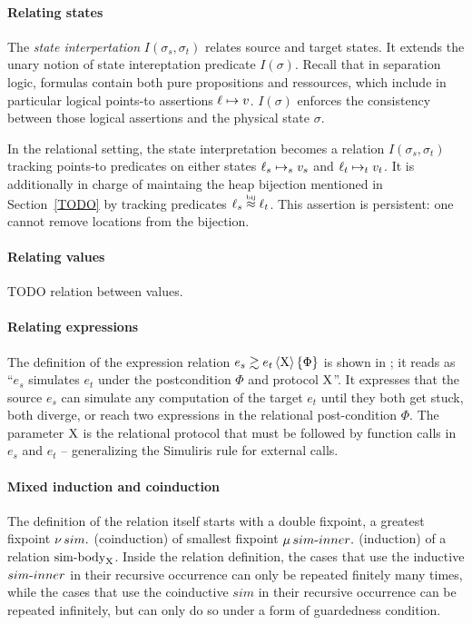 \paragraph{Relating states} The \emph{state interpertation} $I(\sigma_s, \sigma_t)$ relates source and target states. It extends the unary notion of state intereptation predicate $I(\sigma)$. Recall that in separation logic, formulas contain both pure propositions and ressources, which include in particular logical points-to assertions $\ell \mapsto v$. $I(\sigma)$ enforces the consistency between those logical assertions and the physical state $\sigma$.

In the relational setting, the state interpretation becomes a relation $I(\sigma_s, \sigma_t)$ tracking points-to predicates on either states $\ell_s \mapsto_s v_s$ and $\ell_t \mapsto_t v_t$. It is additionally in charge of maintaing the heap bijection mentioned in Section~\ref{TODO} by tracking predicates $\ell_s \stackrel{\scriptscriptstyle\textrm{bij}}{\approx} \ell_t$. This assertion is persistent: one cannot remove locations from the bijection.

\paragraph{Relating values} TODO relation between values.

\paragraph{Relating expressions} The definition of the expression relation $\iSim[\Chi]{\Phi}{e_s}{e_t}$ is shown in ; it reads as ``$e_s$ simulates $e_t$ under the postcondition $\Phi$ and protocol $\mathrm{X}$''. It expresses that the source $e_s$ can simulate any computation of the target $e_t$ until they both get stuck, both diverge, or reach two expressions in the relational post-condition $\Phi$. The parameter $\mathrm{X}$ is the relational protocol that must be followed by function calls in $e_s$ and $e_t$ -- generalizing the Simuliris rule for external calls.

\paragraph{Mixed induction and coinduction}
The definition of the relation itself starts with a double fixpoint, a greatest fixpoint $\operatorname{\nu} sim .$ (coinduction) of smallest fixpoint $\operatorname{\mu} {sim {\hbox{-}} inner} .$ (induction) of a relation $\mathrm{sim {\hbox{-}} body}_{\mathrm{X}}$. Inside the relation definition, the cases that use the inductive $sim {\hbox{-}} inner$ in their recursive occurrence can only be repeated finitely many times, while the cases that use the coinductive $sim$ in their recursive occurrence can be repeated infinitely, but can only do so under a form of guardedness condition.


